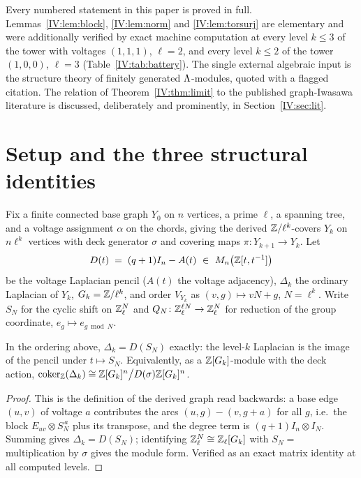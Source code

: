 Every numbered statement in this paper is proved in full. Lemmas~\ref{IV:lem:block},
\ref{IV:lem:norm} and \ref{IV:lem:torsurj} are elementary and were additionally verified by
exact machine computation at every level $k\le3$ of the tower with voltages $(1,1,1)$,
$\ell=2$, and every level $k\le2$ of the tower $(1,0,0)$, $\ell=3$
(Table~\ref{IV:tab:battery}). The single external algebraic input is the structure
theory of finitely generated $\Lambda$-modules, quoted with a flagged citation. The
relation of Theorem~\ref{IV:thm:limit} to the published graph-Iwasawa literature is
discussed, deliberately and prominently, in Section~\ref{IV:sec:lit}.

\section{Setup and the three structural identities}\label{IV:sec:setup}

Fix a finite connected base graph $Y_0$ on $n$ vertices, a prime $\ell$, a spanning
tree, and a voltage assignment $\alpha$ on the chords, giving the derived
$\mathbb{Z}/\ell^k$-covers $Y_k$ on $n\ell^k$ vertices with deck generator $\sigma$ and
covering maps $\pi\colon Y_{k+1}\to Y_k$. Let
\[
D(t)\;=\;(q+1)I_n-A(t)\ \in\ M_n\bigl(\Z[t,t^{-1}]\bigr)
\]
be the voltage Laplacian pencil ($A(t)$ the voltage adjacency), $\Delta_k$ the
ordinary Laplacian of $Y_k$, $G_k=\mathbb{Z}/\ell^k$, and order $V_{Y_k}$ as
$(v,g)\mapsto vN+g$, $N=\ell^k$. Write $S_N$ for the cyclic shift on $\mathbb{Z}_\ell^N$ and
$Q_N\colon\mathbb{Z}_\ell^{\ell N}\to\mathbb{Z}_\ell^{N}$ for reduction of the group coordinate,
$e_g\mapsto e_{g\bmod N}$.

\begin{lemma}\label{IV:lem:block}
In the ordering above, $\Delta_k=D(S_N)$ exactly: the level-$k$ Laplacian is the
image of the pencil under $t\mapsto S_N$. Equivalently, as a
$\mathbb{Z}[G_k]$-module with the deck action,
$\operatorname{coker}_{\mathbb{Z}}(\Delta_k)\cong\mathbb{Z}[G_k]^n\big/D(\sigma)\mathbb{Z}[G_k]^n$.
\end{lemma}

\begin{proof}
This is the definition of the derived graph read backwards: a base edge $(u,v)$ of
voltage $a$ contributes the arcs $(u,g)\!-\!(v,g{+}a)$ for all $g$, i.e.\ the block
$E_{uv}\otimes S_N^{\,a}$ plus its transpose, and the degree term is
$(q+1)I_n\otimes I_N$. Summing gives $\Delta_k=D(S_N)$; identifying
$\mathbb{Z}_\ell^N\cong\mathbb{Z}_\ell[G_k]$ with $S_N=$ multiplication by $\sigma$ gives the module form.
Verified as an exact matrix identity at all computed levels.
\end{proof}

